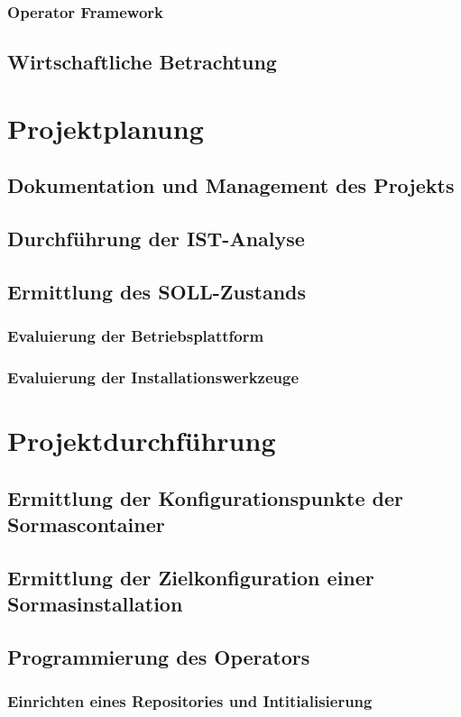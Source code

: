 \documentclass[a4paper,11pt]{article}
\begin{document}
      \subsubsection{Operator Framework}
    \subsection{Wirtschaftliche Betrachtung}
  \section{Projektplanung}
    \subsection{Dokumentation und Management des Projekts}
    \subsection{Durchführung der IST-Analyse}
    \subsection{Ermittlung des SOLL-Zustands}
      \subsubsection{Evaluierung der Betriebsplattform}
      \subsubsection{Evaluierung der Installationswerkzeuge}
  \section{Projektdurchführung}
    \subsection{Ermittlung der Konfigurationspunkte der Sormascontainer}
    \subsection{Ermittlung der Zielkonfiguration einer Sormasinstallation}
    \subsection{Programmierung des Operators}
      \subsubsection{Einrichten eines Repositories und Intitialisierung}
\end{document}

